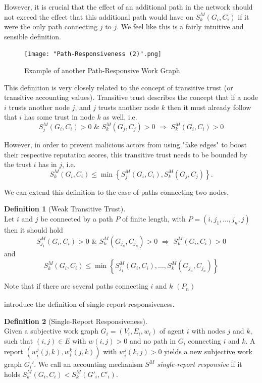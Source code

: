 \documentclass[11pt,a4paper]{report}
\theoremstyle{definition}
\newtheorem{definition}{Definition}[section]
\theoremstyle{theorem}
\theoremstyle{proposition}
\theoremstyle{corollary}
\theoremstyle{lemma}
\theoremstyle{example}
\theoremstyle{remark}
\begin{document}
\noindent{}However, it is crucial that the effect of an additional path in the network should not exceed the effect that this additional path would have on $S^M_k(G_i,C_i)$ if it were the only path connecting $j$ to $j$. We feel like this is a fairly intuitive and sensible definition. \vspace{1em}\\

\begin{figure}[H]
\begin{center}
\texttt{[image: "Path-Responsiveness (2)".png]}
\caption{Example of another Path-Responsive Work Graph}
\label{fig:Example of another Path-Responsive Work Graph}
\end{center}
\end{figure}

\noindent{}This definition is very closely related to the concept of transitive trust (or transitive accounting values). Transitive trust describes the concept that if a node $i$ trusts another node $j$, and $j$ trusts another node $k$ then it must already follow that $i$ has some trust in node $k$ as well, i.e. 
\[
S^M_j(G_i,C_i)>0\,\,\&\,\,S^M_k(G_j,C_j)>0\,\,\Rightarrow\,\,S^M_k(G_i,C_i)>0
\]

\noindent{}However, in order to prevent malicious actors from using "fake edges" to boost their respective reputation scores, this transitive trust needs to be bounded by the trust $i$ has in $j$, i.e.
\[
S^M_k(G_i,C_i)\leq\min\left\lbrace{}S^M_j(G_i,C_i), S^M_k(G_j,C_j)\right\rbrace .
\] 

\noindent{}We can extend this definition to the case of paths connecting two nodes.
\begin{definition}[Weak Transitive Trust]\ \\
Let $i$ and $j$ be connected by a path $P$ of finite length, with $P=(i,j_1,\ldots,j_n,j)$ then it should hold 
\[
S^M_{j_1}(G_i,C_i)>0\,\,\&\,\,S^M_k(G_{j_n},C_{j_n})>0\,\,\Rightarrow\,\,S^M_k(G_i,C_i)>0
\]
\noindent{}and
\[
S^M_k(G_i,C_i)\leq\min\left\lbrace{}S^M_{j_1}(G_i,C_i),\ldots,S^M_{k}(G_{j_n},C_{j_n})\right\rbrace
\]

\noindent{}Note that if there are several paths connecting $i$ and $k$ $(P_n)_{}$
\end{definition}



\noindent{}\cite{On the Sybil-Proofness of Accounting Mechanisms} introduce the definition of single-report responsiveness. 

\begin{definition}[Single-Report Responsiveness]\ \\
Given a subjective work graph $G_i=(V_i,E_i,w_i)$ of agent $i$ with nodes $j$ and $k$, such that $(i,j)\in{}E$ with $w(i,j)>0$ and no path in $G_i$ connecting $i$ and $k$. A report $(w^j_i(j,k),w^k_i(j,k))$ with $w^j_i(k,j)>0$ yields a new subjective work graph $G_i'$. We call an accounting mechanism $S^M$ {\it single-report responsive} if it holds $S^M_k(G_i,C_i)<S^M_k(G'_i,C'_i)$. 
\end{definition}
\end{document}
